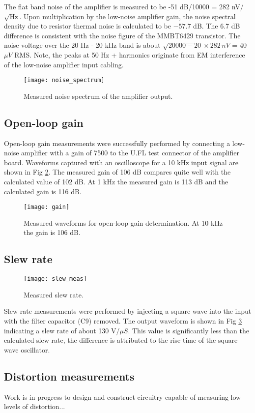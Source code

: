 \documentclass[a4paper,10pt, oneside]{article}
\begin{document}
The flat band noise of the amplifier is measured to be -51 dB/10000 =  282 nV/$\sqrt{\textrm{Hz}}$. Upon multiplication by the low-noise
amplifier gain, the noise spectral density due to resistor thermal noise is calculated to be $-57.7$ dB. The 6.7 dB difference is consistent with the noise figure of the 
MMBT6429 transistor. The noise voltage over the 20 Hz - 20 kHz band is about $\sqrt{20000-20}\times 282\,nV$ = 40 $\mu V$ RMS. 
Note, the peaks at 50 Hz + harmonics originate from EM interference of the low-noise amplifier input cabling. 
\begin{figure}
	\texttt{[image: noise\_spectrum]}
	\caption{Measured noise spectrum of the amplifier output.}\label{noise}
\end{figure}

\subsection*{Open-loop gain}
Open-loop gain measurements were successfully performed by connecting a low-noise amplifier with a gain of 7500 to the U.FL test connector 
of the amplifier board. Waveforms captured with an oscilloscope for a 10 kHz input signal are shown in Fig \ref{gain}. The measured gain of 
106 dB compares quite well with the calculated value of 102 dB. At 1 kHz the measured gain is 113 dB and the calculated gain is 116 dB. 
\begin{figure}[H]
	\texttt{[image: gain]}
	\caption{Measured waveforms for open-loop gain determination. At 10 kHz the gain is 106 dB.}\label{gain}
\end{figure}
\subsection*{Slew rate}
\begin{figure}[H]
	\texttt{[image: slew\_meas]}
	\caption{Measured slew rate.}\label{slew_meas}
\end{figure}
Slew rate measurements were performed by injecting a square wave into the input with the filter capacitor (C9) removed. 
The output waveform is shown in Fig \ref{slew_meas} indicating a slew rate of about 130 V/$\mu S$. This value is significantly less than
the calculated slew rate, the difference is attributed to the rise time of the square wave oscillator. 
\subsection*{Distortion measurements}
Work is in progress to design and construct circuitry capable of measuring low levels of distortion...
\end{document}
